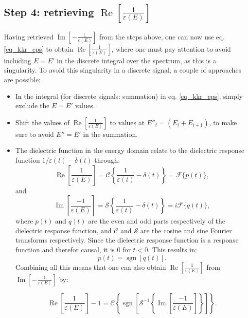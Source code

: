 \subsection{Step 4: retrieving $\operatorname{Re}\left[\frac{1}{\varepsilon(E)}\right]$ }
Having retrieved $\operatorname{Im}\left[-\frac{1}{\varepsilon(E)}\right]$ from the steps above, one can now use eq. \eqref{eq_kkr_eps} to obtain $\operatorname{Re}\left[\frac{1}{\varepsilon(E)}\right]$, where one must pay attention to avoid including $E=E'$ in the discrete integral over the spectrum, as this is a singularity. To avoid this singularity in a discrete signal, a couple of approaches are possible:
\begin{itemize}
    \item In the integral (for discrete signals: summation) in eq. \eqref{eq_kkr_eps}, simply exclude the $E = E'$ values.
    \item Shift the values of $\operatorname{Re}\left[\frac{1}{\varepsilon(E)}\right]$ to values at $E''_i = (E_i + E_{i+1})$, to make sure to avoid $E'' = E'$ in the summation.
    \item  The dielectric function in the energy domain relate to the dielectric response function $1/\varepsilon(t) -\delta(t)$ through:
    \begin{equation}
        \operatorname{Re}\left[\frac{1}{\varepsilon(E)}\right] = \mathcal{C}\left\{\frac{1}{\varepsilon(t)} - \delta(t)\right\} = \mathcal{F}\{p(t)\},
    \end{equation}
    and 
    \begin{equation}
        \operatorname{Im}\left[\frac{-1}{\varepsilon(E)}\right] = \mathcal{S}\left\{\frac{1}{\varepsilon(t)} - \delta(t)\right\} = i\mathcal{F}\{q(t)\},
    \end{equation}
    where $p(t)$ and $q(t)$ are the even and odd parts respectively of the dielectric response function, and $\mathcal{C}$ and $\mathcal{S}$ are the cosine and sine Fourier transforms respectively. Since the dielectric response function is a response function and therefor causal, it is $0$ for $t<0$. This results in:
    \begin{equation}
        p(t) = \operatorname{sgn}[q(t)].
    \end{equation}
    Combining all this means that one can also obtain $\operatorname{Re}\left[\frac{1}{\varepsilon(E)}\right]$ from $\operatorname{Im}\left[-\frac{1}{\varepsilon(E)}\right]$ by:
    
    \begin{equation}
        \operatorname{Re}\left[\frac{1}{\varepsilon(E)}\right] - 1 =\mathcal{C}\left\{\operatorname{sgn}\left[\mathcal{S}^{-1}\left\{\operatorname{Im}\left[\frac{-1}{ \varepsilon(E)}\right]\right\}\right]\right\}.
    \end{equation}
\end{itemize}

